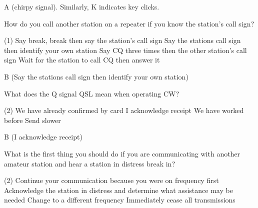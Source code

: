 \documentclass[a4paper]{article}
\begin{document}
\begin{solution}
	A (chirpy signal). Similarly, \apostrophe{}K\apostrophe{} indicates key clicks.
\end{solution}

\vspace{5mm}



\begin{question}How do you call another station on a repeater if you know the station's call sign?
	\begin{tasks}(1)
		\task Say \apostrophe{}break, break\apostrophe{} then say the station's call sign
		\task Say the station\apostrophe{}s call sign then identify your own station
		\task Say \apostrophe{}CQ\apostrophe{} three times then the other station's call sign
		\task Wait for the station to call \apostrophe{}CQ\apostrophe{} then answer it
	\end{tasks}
\end{question}

\begin{solution}
	B (Say the station\apostrophe{}s call sign then identify your own station)
\end{solution}

\vspace{5mm}



\begin{question}What does the Q signal \apostrophe{}QSL\apostrophe{} mean when operating CW?
	\begin{tasks}(2)
		\task We have already confirmed by card
		\task I acknowledge receipt
		\task We have worked before
		\task Send slower
	\end{tasks}
\end{question}

\begin{solution}
	B (I acknowledge receipt)
\end{solution}

\vspace{5mm}



\begin{question}What is the first thing you should do if you are communicating with another amateur station and hear a station in distress break in?
	\begin{tasks}(2)
		\task Continue your communication because you were on frequency first
		\task Acknowledge the station in distress and determine what assistance may be needed
		\task Change to a different frequency
		\task Immediately cease all transmissions
	\end{tasks}
\end{question}
\end{document}
